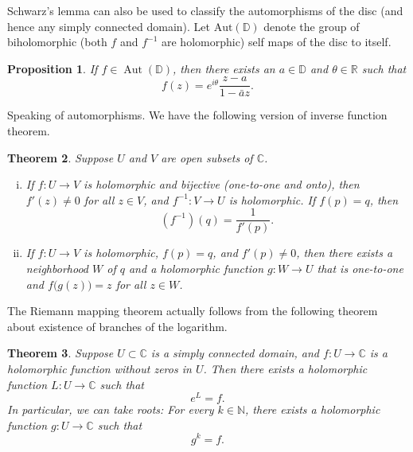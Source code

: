\documentclass[12pt,openany]{book}
\newcommand{\C}{{\mathbb{C}}}
\newcommand{\R}{{\mathbb{R}}}
\newcommand{\N}{{\mathbb{N}}}
\newcommand{\D}{{\mathbb{D}}}
\theoremstyle{plain}
\newtheorem{thm}{Theorem}[section]
\newtheorem{prop}[thm]{Proposition}
\theoremstyle{remark}
\theoremstyle{definition}
\theoremstyle{exercise}
\theoremstyle{example}
\begin{document}
Schwarz's lemma can also be used to classify the automorphisms of the disc
(and hence any simply connected domain).  Let
$\operatorname{Aut(\D)}$ denote the group of biholomorphic (both $f$ and
$f^{-1}$ are holomorphic) self maps of the
disc to itself.

\begin{prop}
If $f \in \operatorname{Aut}(\D)$, then there exists an $a \in \D$
and $\theta \in \R$ such that
\begin{equation*}
f(z) = e^{i\theta} \frac{z-a}{1-\bar{a}z} .
\end{equation*}
\end{prop}

Speaking of automorphisms.  We have the following
version of inverse function theorem.

\begin{thm}
Suppose $U$ and $V$ are open subsets of $\C$.
\begin{enumerate}[(i)]
\item
If $f \colon U \to V$ is holomorphic and bijective (one-to-one and onto),
then $f'(z) \not= 0$ for all $z \in V$, and $f^{-1} \colon V \to U$
is holomorphic.  If $f(p) = q$, then
\begin{equation*}
\left(f^{-1}\right)(q) = \frac{1}{f'(p)} .
\end{equation*}
\item
If $f \colon U \to V$ is holomorphic, $f(p) = q$,
and $f'(p) \not= 0$, then there exists a neighborhood $W$ of $q$
and a holomorphic function $g \colon W \to U$ that is
one-to-one and $f\bigl(g(z)\bigr) = z$ for all $z \in W$.
\pagebreak[2]
\end{enumerate}
\end{thm}

The Riemann mapping theorem actually follows from the following
theorem about existence of branches of the logarithm.

\begin{thm}
Suppose $U \subset \C$ is a simply connected domain, and $f \colon U \to \C$
is a holomorphic function without zeros in $U$.  Then there exists a
holomorphic function $L \colon U \to \C$ such that
\begin{equation*}
e^L = f .
\end{equation*}
In particular, we can take roots:
For every $k \in \N$, there exists a holomorphic function
$g \colon U \to \C$ such that
\begin{equation*}
g^k = f .
\end{equation*}
\end{thm}
\end{document}
